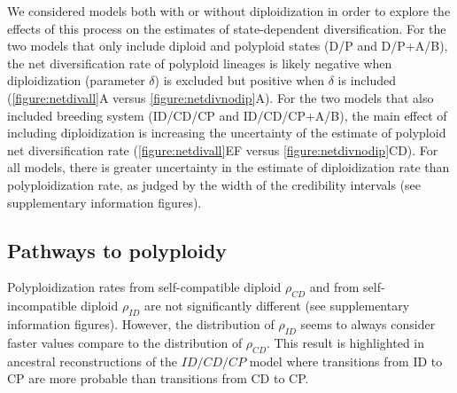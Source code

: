 We considered models both with or without diploidization in order to explore the effects of this process on the estimates of state-dependent diversification.
For the two models that only include diploid and polyploid states (D/P and D/P+A/B), the net diversification rate of polyploid lineages is likely negative when diploidization (parameter $\delta$) is excluded but positive when $\delta$ is included (\cref{figure:netdivall}A versus \cref{figure:netdivnodip}A).
For the two models that also included breeding system (ID/CD/CP and ID/CD/CP+A/B), the main effect of including diploidization is increasing the uncertainty of the estimate of polyploid net diversification rate (\cref{figure:netdivall}EF versus \cref{figure:netdivnodip}CD).
For all models, there is greater uncertainty in the estimate of diploidization rate than polyploidization rate, as judged by the width of the credibility intervals (see supplementary information figures). %


\subsection{Pathways to polyploidy}


Polyploidization rates from self-compatible diploid $\rho_{CD}$ and from self-incompatible diploid $\rho_{ID}$ are not significantly different (see supplementary information figures).
However, the distribution of $\rho_{ID}$ seems to always consider faster values compare to the distribution of $\rho_{CD}$.
This result is highlighted in ancestral reconstructions of the $ID/CD/CP$ model where transitions from ID to CP are more probable than transitions from CD to CP. %

